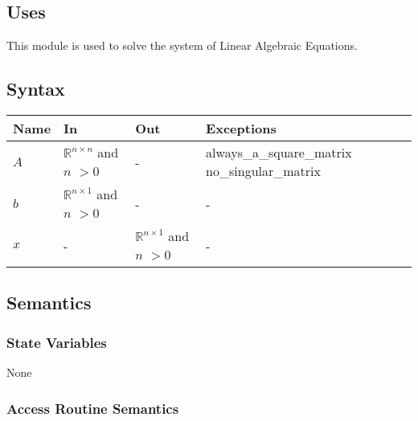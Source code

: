 \documentclass[12pt, titlepage]{article}
\begin{document}
\subsection{Uses}
This module is used to solve the system of Linear Algebraic Equations.


\subsection{Syntax}

\begin{center}
\begin{tabular}{p{2cm} p{4cm} p{4cm} p{2cm}}
\hline
\textbf{Name} & \textbf{In} & \textbf{Out} & \textbf{Exceptions} \\
\hline

$A$ & $\mathbb{R}^{n \times n}$ and $n$ $> 0$ & - &  always\_a\_square\_matrix no\_singular\_matrix \\
$b$ & $\mathbb{R}^{n \times 1}$ and $n$ $> 0$ & - & - \\
$x$ & - & $\mathbb{R}^{n \times 1}$ and $n$ $> 0$ & - \\
\hline
\end{tabular}
\end{center}

\subsection{Semantics}

\subsubsection{State Variables}

None

\subsubsection{Access Routine Semantics}
\end{document}

